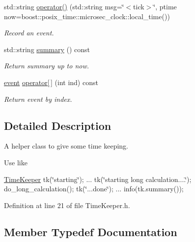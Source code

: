 \begin{DoxyCompactItemize}
std\+::string \hyperlink{class_wire_cell_1_1_time_keeper_a7f27087fcc02a6b5fea15702a83b40c2}{operator()} (std\+::string msg=\char`\"{}$<$tick$>$\char`\"{}, ptime now=boost\+::posix\+\_\+time\+::microsec\+\_\+clock\+::local\+\_\+time())
\begin{DoxyCompactList}\small\item\em Record an event. \end{DoxyCompactList}\item 
std\+::string \hyperlink{class_wire_cell_1_1_time_keeper_a20b7fb14f514bd61e53c77f5cb035e47}{summary} () const
\begin{DoxyCompactList}\small\item\em Return summary up to now. \end{DoxyCompactList}\item 
\hyperlink{class_wire_cell_1_1_time_keeper_a005e8d06f1e537abed3a83184ccfcc5e}{event} \hyperlink{class_wire_cell_1_1_time_keeper_a2c2df62235506b76bfa328e2a84a9593}{operator\mbox{[}$\,$\mbox{]}} (int ind) const
\begin{DoxyCompactList}\small\item\em Return event by index. \end{DoxyCompactList}\end{DoxyCompactItemize}


\subsection{Detailed Description}
A helper class to give some time keeping.

Use like

\hyperlink{class_wire_cell_1_1_time_keeper}{Time\+Keeper} tk(\char`\"{}starting\char`\"{}); ... tk(\char`\"{}starting long calculation....\char`\"{}); do\+\_\+long\+\_\+calculation(); tk(\char`\"{}...\+done\char`\"{}); ... info(tk.\+summary()); 

Definition at line 21 of file Time\+Keeper.\+h.



\subsection{Member Typedef Documentation}
\mbox{\label{class_wire_cell_1_1_time_keeper_a3e7203525811fc9902aab31615d18ad2}} 
